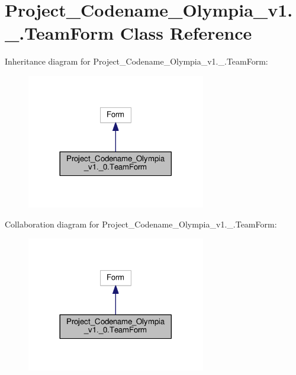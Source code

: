 \hypertarget{classProject__Codename__Olympia__v1_1_1__0_1_1TeamForm}{}\section{Project\+\_\+\+Codename\+\_\+\+Olympia\+\_\+v1.\+\_.\+Team\+Form Class Reference}
\label{classProject__Codename__Olympia__v1_1_1__0_1_1TeamForm}


Inheritance diagram for Project\+\_\+\+Codename\+\_\+\+Olympia\+\_\+v1.\+\_.\+Team\+Form\+:
\nopagebreak
\begin{figure}[H]
\begin{center}
\leavevmode
\includegraphics[width=221pt]{classProject__Codename__Olympia__v1_1_1__0_1_1TeamForm__inherit__graph}
\end{center}
\end{figure}


Collaboration diagram for Project\+\_\+\+Codename\+\_\+\+Olympia\+\_\+v1.\+\_.\+Team\+Form\+:
\nopagebreak
\begin{figure}[H]
\begin{center}
\leavevmode
\includegraphics[width=221pt]{classProject__Codename__Olympia__v1_1_1__0_1_1TeamForm__coll__graph}
\end{center}
\end{figure}
